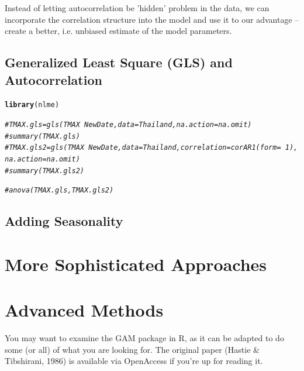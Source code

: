 \documentclass{article}\usepackage[]{graphicx}\usepackage[]{color}
\makeatletter
\newcommand{\hlcom}[1]{\textcolor[rgb]{0.678,0.584,0.686}{\textit{#1}}}%
\newcommand{\hlstd}[1]{\textcolor[rgb]{0.345,0.345,0.345}{#1}}%
\newcommand{\hlkwd}[1]{\textcolor[rgb]{0.737,0.353,0.396}{\textbf{#1}}}%
\newenvironment{kframe}{%
 \def\at@end@of@kframe{}%
 \ifinner\ifhmode%
  \def\at@end@of@kframe{\end{minipage}}%
  \begin{minipage}{\columnwidth}%
 \fi\fi%
 \def\FrameCommand##1{\hskip\@totalleftmargin \hskip-\fboxsep
 \colorbox{shadecolor}{##1}\hskip-\fboxsep
     \hskip-\linewidth \hskip-\@totalleftmargin \hskip\columnwidth}%
 \MakeFramed {\advance\hsize-\width
   \@totalleftmargin\z@ \linewidth\hsize
   \@setminipage}}%
 {\par\unskip\endMakeFramed%
 \at@end@of@kframe}
\newenvironment{knitrout}{}{} %
\makeatother
\begin{document}
Instead of letting autocorrelation be 'hidden' problem in the data, we can incorporate the correlation structure into the model and use it to our advantage -- create a better, i.e. unbiased estimate of the model parameters.

\subsection{Generalized Least Square (GLS) and Autocorrelation}

\begin{knitrout}
\color{fgcolor}\begin{kframe}
\begin{alltt}
\hlkwd{library}\hlstd{(nlme)}
\end{alltt}


{\ttfamily\noindent\itshape\color{messagecolor}{\#\# \\\#\# Attaching package: 'nlme'}}

{\ttfamily\noindent\itshape\color{messagecolor}{\#\# The following object is masked from 'package:dplyr':\\\#\# \\\#\#\ \ \ \  collapse}}\begin{alltt}
\hlcom{#TMAX.gls = gls(TMAX ~ NewDate, data = Thailand, na.action=na.omit)}
\hlcom{#summary(TMAX.gls)}
\hlcom{#TMAX.gls2 = gls(TMAX ~ NewDate, data = Thailand, correlation = corAR1(form=~1), na.action=na.omit)}
\hlcom{#summary(TMAX.gls2)}

\hlcom{#anova(TMAX.gls, TMAX.gls2)}
\end{alltt}
\end{kframe}
\end{knitrout}


\subsection{Adding Seasonality}


\section{More Sophisticated Approaches}

\section{Advanced Methods}

You may want to examine the GAM package in R, as it can be adapted to do some (or all) of what you are looking for. The original paper (Hastie \& Tibshirani, 1986) is available via OpenAccess if you're up for reading it.
\end{document}

